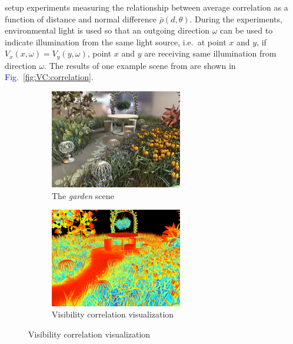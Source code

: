 \documentclass[]{book}
\renewcommand{\figurename}{\textcolor{blue}{Fig.\ }}
\begin{document}
\citeauthor{clarberg2008VisCorrelation} setup experiments measuring the relationship between average correlation as a function of distance and normal difference $\bar{\rho}(d, \theta)$.
During the experiments, environmental light is used so that an outgoing direction $\omega$ can be used to indicate illumination from the same light source, i.e.\ at point $x$ and $y$, if $V_x(x, \omega) = V_y(y, \omega)$, point $x$ and $y$ are receiving same illumination from direction $\omega$.
The results of one example scene from \cite{clarberg2008VisCorrelation} are shown in \figurename \ref{fig:VC:correlation}.

\begin{figure}
	\begin{subfigure}{0.5\textwidth}
		\centering
		\includegraphics[height=1.7in]{img/VC-2-correlate1.png}
		\caption{The \textit{garden} scene}
	\end{subfigure}%
	\begin{subfigure}{0.5\textwidth}
		\centering
		\includegraphics[height=1.7in]{img/VC-2-correlate2.png}
		\caption{Visibility correlation visualization}
	\end{subfigure}
	

\end{figure}
\end{document}
